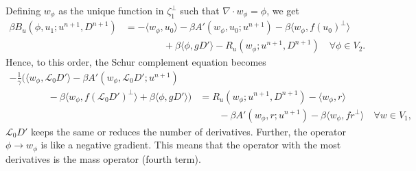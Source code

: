 \documentclass{article}
\begin{document}
Defining $w_\phi$ as the unique function in $\zeta_1^{\perp}$ such
that $\nabla\cdot w_\phi=\phi$, we get
\begin{align}
  \nonumber
  \beta B_u(\phi, u_1; u^{n+1},D^{n+1})
  & = 
  -\langle w_{\phi}, u_0 \rangle - \beta A'(w_\phi, u_0; u^{n+1})
  - \beta\langle w_\phi, f(u_0)^{\perp}\rangle \\
  & \qquad\qquad
  + \beta\langle \phi, gD'\rangle
  -R_u(w_\phi;u^{n+1},D^{n+1})
  \quad \forall \phi \in V_2.
\end{align}
Hence, to this order, the Schur complement equation becomes
\begin{align}
  \nonumber
  -\frac{1}{\gamma}\Big(\langle w_{\phi}, \mathcal{L}_0D' \rangle 
  - \beta A'(w_\phi, \mathcal{L}_0D'; u^{n+1}) & \\
  \nonumber
\qquad  \qquad   - \beta\langle w_\phi, f(\mathcal{L}_0D')^{\perp}\rangle
  + \beta\langle \phi, gD'\rangle\Big)
  &= R_u(w_\phi;u^{n+1},D^{n+1})
  -\langle w_{\phi}, r \rangle  \\
  & \qquad -\beta A'(w_\phi, r; u^{n+1})
  - \beta\langle w_\phi, fr^{\perp}\rangle
  \quad \forall w \in V_1,
\end{align}
$\mathcal{L}_0D'$ keeps the same or reduces the number of derivatives.
Further, the operator $\phi\to w_\phi$ is like a negative gradient.
This means that the operator with the most derivatives is the
mass operator (fourth term).
\end{document}
